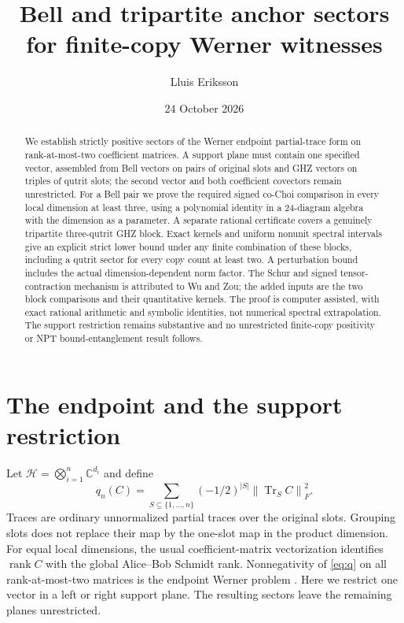 \documentclass[11pt,a4paper]{article}
\title{Bell and tripartite anchor sectors\\for finite-copy Werner witnesses}
\author{Lluis Eriksson}
\date{24 October 2026}
\newcommand{\tr}{\operatorname{Tr}}
\newcommand{\rank}{\operatorname{rank}}
\newcommand{\HH}{\mathcal H}
\newcommand{\norm}[1]{\left\lVert#1\right\rVert}
\begin{document}
\maketitle
\begin{abstract}
We establish strictly positive sectors of the Werner endpoint partial-trace form on rank-at-most-two coefficient matrices. A support plane must contain one specified vector, assembled from Bell vectors on pairs of original slots and GHZ vectors on triples of qutrit slots; the second vector and both coefficient covectors remain unrestricted. For a Bell pair we prove the required signed co-Choi comparison in every local dimension at least three, using a polynomial identity in a 24-diagram algebra with the dimension as a parameter. A separate rational certificate covers a genuinely tripartite three-qutrit GHZ block. Exact kernels and uniform nonunit spectral intervals give an explicit strict lower bound under any finite combination of these blocks, including a qutrit sector for every copy count at least two. A perturbation bound includes the actual dimension-dependent norm factor. The Schur and signed tensor-contraction mechanism is attributed to Wu and Zou; the added inputs are the two block comparisons and their quantitative kernels. The proof is computer assisted, with exact rational arithmetic and symbolic identities, not numerical spectral extrapolation. The support restriction remains substantive and no unrestricted finite-copy positivity or NPT bound-entanglement result follows.
\end{abstract}

\section{The endpoint and the support restriction}
Let $\HH=\bigotimes_{i=1}^n\mathbb C^{d_i}$ and define
\begin{equation}\label{eq:q}
 q_n(C)=\sum_{S\subseteq\{1,\ldots,n\}}(-1/2)^{|S|}
                 \norm{\tr_S C}_F^2 .
\end{equation}
Traces are ordinary unnormalized partial traces over the original slots. Grouping slots does not replace their map by the one-slot map in the product dimension. For equal local dimensions, the usual coefficient-matrix vectorization identifies $\rank C$ with the global Alice--Bob Schmidt rank. Nonnegativity of \eqref{eq:q} on all rank-at-most-two matrices is the endpoint Werner problem \cite{costa,bharti}. Here we restrict one vector in a left or right support plane. The resulting sectors leave the remaining planes unrestricted.
\end{document}

